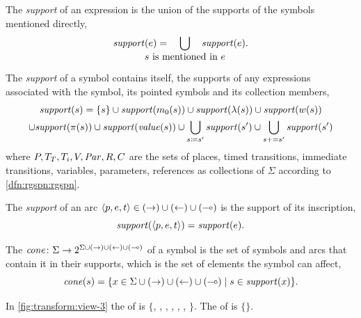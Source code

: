 \begin{dfn}
  The \emph{support} of an expression is the union of the supports of the symbols mentioned directly,
  \begin{equation}
    \rel{support}(e) = \quad\bigcup_{\hsmash{\text{\(s\) is mentioned in \(e\)}}}\quad \rel{support}(e) \text.
  \end{equation}
  
  The \emph{support} of a symbol contains itself, the supports of any expressions associated with the symbol, its pointed symbols and its collection members,
  \begin{multline}
    \textrm{\itshape support\/}(s) = \{s\} \cup \textrm{\itshape support\/}(m_0(s)) \cup \textrm{\itshape support\/}(\lambda(s)) \cup \textrm{\itshape support\/}(w(s))\\\cup \textrm{\itshape support\/}(\pi(s)) \cup \textrm{\itshape support\/}(\textrm{\itshape value\/}(s)) \cup \bigcup_{s \coloneq s'} \textrm{\itshape support\/}(s') \cup \bigcup_{s \mathrel{{+}{=}} s'} \textrm{\itshape support\/}(s')
  \end{multline}
  where \(P, T_T, T_i, V, \textrm{\itshape Par\/}, R, C\) are the sets of places, timed transitions, immediate transitions, variables, parameters, references as collections of \(\Sigma\) according to \vref{dfn:rgspn:rgspn}.

  The \emph{support} of an arc \(\langle p, e, t\rangle \in ({\rightarrow}) \cup ({\leftarrow}) \cup ({\multimap})\) is the support of its inscription,
  \begin{equation}
    \textrm{\itshape support\/}(\langle p, e, t \rangle) = \textrm{\itshape support\/}(e) \text.
  \end{equation}

  The \(\textrm{\itshape cone\/}\colon \Sigma \to 2^{\Sigma \cup (\rightarrow) \cup (\leftarrow) \cup (\multimap)}\) of a symbol is the set of symbols and arcs that contain it in their supports, which is the set of  elements the symbol can affect,
  \begin{equation}
    \textrm{\itshape cone\/}(s) = \{x \in \Sigma \cup (\rightarrow) \cup (\leftarrow) \cup (\multimap) \mid s \in \textrm{\itshape support\/}(x)\} \text.
  \end{equation}
\end{dfn}

\begin{example}
  In \vref{fig:transform:view-3} the  of  is \(\{\), , , , , , \(\}\). The  of  is \(\{\)\(\}\).
\end{example}

